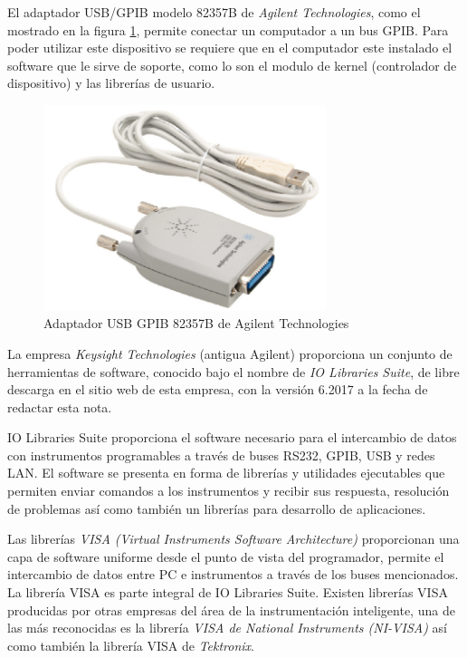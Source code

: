 \documentclass[paper=letter,oneside,fontsize=11pt, parskip=full]{scrartcl}
\begin{document}
		El adaptador USB/GPIB modelo 82357B de \emph{Agilent Technologies}, como el mostrado en la figura \ref{Fig:AdaptadorGpibUsb}, permite conectar un computador a un bus GPIB. Para poder utilizar este dispositivo se requiere que en el computador este instalado el software que le sirve de soporte, como lo son el modulo de kernel (controlador de dispositivo) y las librerías de usuario.	
		
		\begin{figure}[!h]
			\begin{center}
				\includegraphics[height=6cm]{Imagenes/AdaptadorGpibUsb.pdf}
				\caption{Adaptador USB GPIB 82357B de Agilent Technologies}
				\label{Fig:AdaptadorGpibUsb}
			\end{center}
		\end{figure}	
		
		La empresa \emph{Keysight Technologies} (antigua Agilent) proporciona un conjunto de herramientas de software, conocido bajo el nombre de \emph{IO Libraries Suite}, de libre descarga en el sitio web de esta empresa, con la versión 6.2017 a la fecha de redactar esta nota.
		
		IO Libraries Suite proporciona el software necesario para el intercambio de datos con instrumentos programables a través de buses RS232, GPIB, USB y redes LAN. El software se presenta en forma de librerías y utilidades ejecutables que permiten enviar comandos a los instrumentos y recibir sus respuesta, resolución de problemas así como también un librerías para desarrollo de aplicaciones.
		
		Las librerías \emph{VISA (Virtual Instruments Software Architecture)} proporcionan una capa de software uniforme desde el punto de vista del programador, permite el intercambio de datos entre PC e instrumentos a través de los buses mencionados. La librería VISA es parte integral de IO Libraries Suite. Existen librerías VISA producidas por otras empresas del área de la instrumentación inteligente, una de las más reconocidas es la librería \emph{VISA de National Instruments (NI-VISA)} así como también la librería VISA de \emph{Tektronix}.
		
\end{document}
